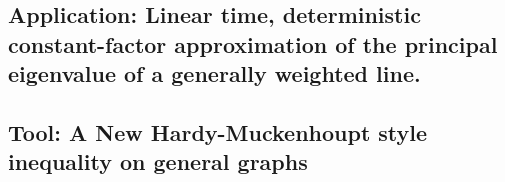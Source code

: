 \subsection{Application: Linear time, deterministic constant-factor approximation of
  the principal eigenvalue of a generally weighted line.}
\subsection{Tool: A New Hardy-Muckenhoupt style inequality on general
  graphs}
